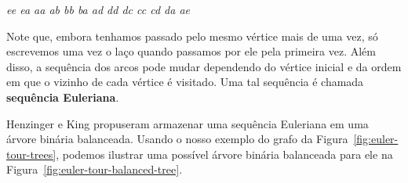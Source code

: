 \begin{center}
    \textit{ee ea aa ab bb ba ad dd dc cc cd da ae}
\end{center}

Note que, embora tenhamos passado pelo mesmo vértice mais de uma vez, só escrevemos uma vez o laço quando passamos por ele pela primeira vez. Além disso, a sequência dos arcos pode mudar dependendo do vértice inicial e da ordem em que o vizinho de cada vértice é visitado. Uma tal sequência é chamada \textbf{sequência Euleriana}. 

Henzinger e King \cite{henzinger_king} propuseram armazenar uma sequência Euleriana em uma árvore binária balanceada. Usando o nosso exemplo do grafo da Figura~\ref{fig:euler-tour-trees}, podemos ilustrar uma possível árvore binária balanceada para ele na Figura~\ref{fig:euler-tour-balanced-tree}.

